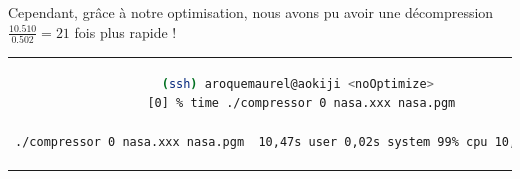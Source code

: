 \documentclass[a4paper, 11pt]{article}
\begin{document}
Cependant, grâce à notre optimisation, nous avons pu avoir une décompression $\frac{10.510}{0.502} = 21$ fois plus rapide ! 

\hspace{-50px}
\begin{tabular}{cc}
\begin{minipage}{0.5\textwidth}
	\begin{lstlisting}[language=Bash,linewidth=280px, caption=Sans optimisation]
 (ssh) aroquemaurel@aokiji <noOptimize>
 [0] % time ./compressor 0 nasa.xxx nasa.pgm

./compressor 0 nasa.xxx nasa.pgm  10,47s user 0,02s system 99% cpu 10,510 total
 \end{lstlisting}
\end{minipage}
&
\begin{minipage}{0.5\textwidth}
	\begin{lstlisting}[language=Bash,linewidth=280px, caption=Avec optimisations]
(ssh) aroquemaurel@aokiji <master>
[0] % time ./compressor 0 nasa.xxx nasa.pgm 

 ./compressor 0 nasa.xxx  nasa.pgm 0,48s user 0,01s system 99% cpu 0,502 total
 \end{lstlisting}
\end{minipage}
\end{tabular}

	\appendix
	\listoffigures
	\lstlistoflistings
\end{document}

